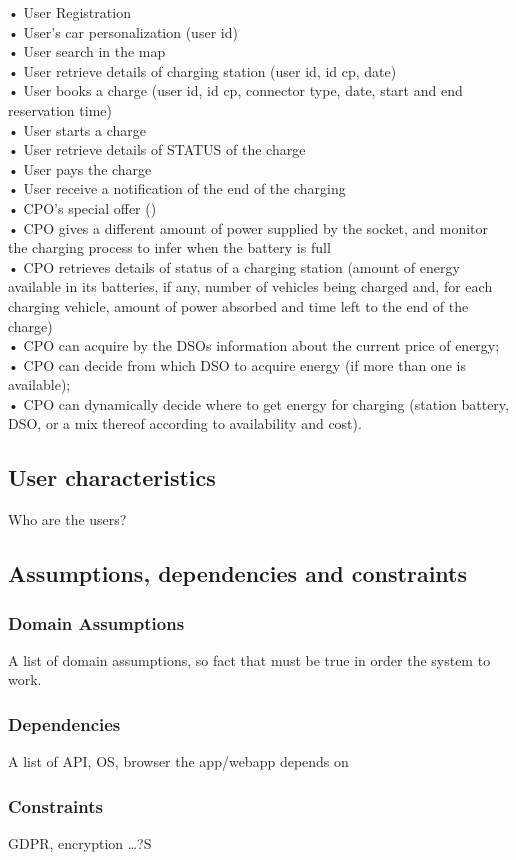 • User Registration \\
• User's car personalization  (user id)\\
• User search in the map\\
• User retrieve details of charging station (user id, id cp, date)\\
• User books a charge (user id, id cp, connector type, date, start and end reservation time)\\
• User starts a charge\\
• User retrieve details of STATUS of the charge\\
• User pays the charge \\
• User receive a notification of the end of the charging\\
• CPO's special offer ()\\
• CPO gives a different amount of power supplied by the socket, and monitor
the charging process to infer when the battery is full\\
• CPO retrieves details of status of a charging station (amount of energy available 
in its batteries, if any, number of vehicles being charged and, for each charging vehicle, amount of power
absorbed and time left to the end of the charge)\\
• CPO can acquire by the DSOs information about the current price of energy;\\
• CPO can decide from which DSO to acquire energy (if more than one is available);\\
• CPO can dynamically decide where to get energy for charging (station battery, DSO, or a mix thereof
according to availability and cost).\\


\subsection{User characteristics}
Who are the users?

\subsection{Assumptions, dependencies and constraints}
\subsubsection*{Domain Assumptions}
A list of domain assumptions, so fact that must be true in order the system to work.
\subsubsection*{Dependencies}
A list of API, OS, browser the app/webapp depends on
\subsubsection*{Constraints}
GDPR, encryption \dots?S
